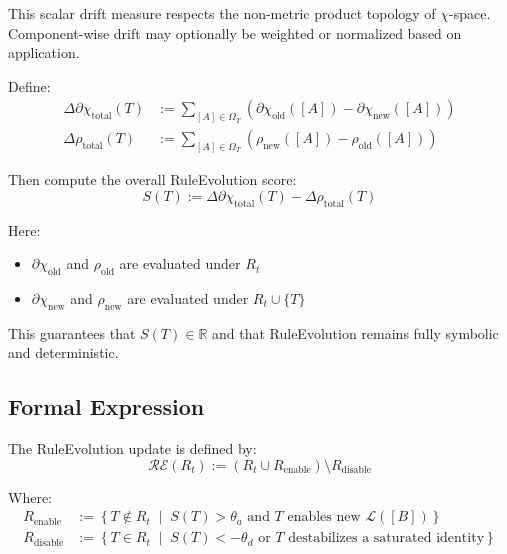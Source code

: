 This scalar drift measure respects the non-metric product topology of $\chi$-space.  
Component-wise drift may optionally be weighted or normalized based on application.

Define:
\begin{align}
\Delta \partial \chi_{\text{total}}(T) &:= \sum_{[A] \in \Omega_T} \left( \partial \chi_{\text{old}}([A]) - \partial \chi_{\text{new}}([A]) \right) \label{eq:delta-drift} \\
\Delta \rho_{\text{total}}(T) &:= \sum_{[A] \in \Omega_T} \left( \rho_{\text{new}}([A]) - \rho_{\text{old}}([A]) \right) \label{eq:delta-rho}
\end{align}

Then compute the overall RuleEvolution score:
\begin{equation} \label{eq:ruleevolution-score}
S(T) := \Delta \partial \chi_{\text{total}}(T) - \Delta \rho_{\text{total}}(T)
\end{equation}

Here:
\begin{itemize}
  \item $\partial \chi_{\text{old}}$ and $\rho_{\text{old}}$ are evaluated under $R_t$
  \item $\partial \chi_{\text{new}}$ and $\rho_{\text{new}}$ are evaluated under $R_t \cup \{T\}$
\end{itemize}

This guarantees that $S(T) \in \mathbb{R}$ and that RuleEvolution remains fully symbolic and deterministic.

\subsection{Formal Expression} \label{formal-expression}

The RuleEvolution update is defined by:
\begin{equation} \label{eq:ruleevolution-update}
\mathcal{RE}(R_t) := \left( R_t \cup R_{\text{enable}} \right) \setminus R_{\text{disable}}
\end{equation}

Where:
\begin{align*}
R_{\text{enable}} &:= \left\{ T \notin R_t \;\middle|\; S(T) > \theta_a \text{ and } T \text{ enables new } \mathcal{L}([B]) \right\} \\
R_{\text{disable}} &:= \left\{ T \in R_t \;\middle|\; S(T) < -\theta_d \text{ or } T \text{ destabilizes a saturated identity} \right\}
\end{align*}

